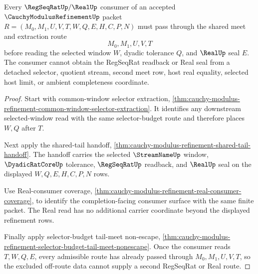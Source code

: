 \begin{theorem}
\label{thm:cauchy-modulus-refinement-shared-meet-regseqrat-route}
Every $\RegSeqRatUp/\RealUp$ consumer of an accepted $\CauchyModulusRefinementUp$ packet $R=(M_0,M_1,U,V,T,W,Q,E,H,C,P,N)$ must pass through the shared meet and extraction route
$$
M_0,M_1,U,V,T
$$
before reading the selected window $W$, dyadic tolerance $Q$, and $\RealUp$ seal $E$. The consumer cannot obtain the RegSeqRat readback or Real seal from a detached selector, quotient stream, second meet row, host real equality, selected host limit, or ambient completeness coordinate.
\end{theorem}
\begin{proof}
Start with common-window selector extraction, \autoref{thm:cauchy-modulus-refinement-common-window-selector-extraction}. It identifies any downstream selected-window read with the same selector-budget route and therefore places $W,Q$ after $T$.

Next apply the shared-tail handoff, \autoref{thm:cauchy-modulus-refinement-shared-tail-handoff}. The handoff carries the selected $\StreamNameUp$ window, $\DyadicRatCoreUp$ tolerance, $\RegSeqRatUp$ readback, and $\RealUp$ seal on the displayed $W,Q,E,H,C,P,N$ rows.

Use Real-consumer coverage, \autoref{thm:cauchy-modulus-refinement-real-consumer-coverage}, to identify the completion-facing consumer surface with the same finite packet. The Real read has no additional carrier coordinate beyond the displayed refinement rows.

Finally apply selector-budget tail-meet non-escape, \autoref{thm:cauchy-modulus-refinement-selector-budget-tail-meet-nonescape}. Once the consumer reads $T,W,Q,E$, every admissible route has already passed through $M_0,M_1,U,V,T$, so the excluded off-route data cannot supply a second RegSeqRat or Real route.
\end{proof}

